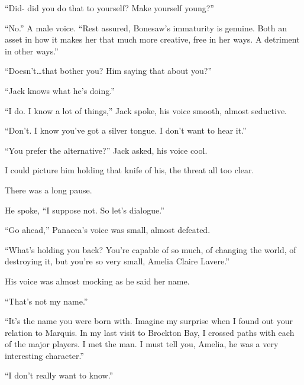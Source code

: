 ``Did- did you do that to yourself?  Make yourself young?''



``No.''  A male voice.  ``Rest assured, Bonesaw's immaturity is genuine.  Both an asset in how it makes her that much more creative, free in her ways.  A detriment in other ways.''



``Doesn't\ldots that bother you?  Him saying that about you?''



``Jack knows what he's doing.''



``I do.  I know a lot of things,'' Jack spoke, his voice smooth, almost seductive.



``Don't.  I know you've got a silver tongue.  I don't want to hear it.''



``You prefer the alternative?''  Jack asked, his voice cool.



I could picture him holding that knife of his, the threat all too clear.



There was a long pause.



He spoke, ``I suppose not.  So let's dialogue.''



``Go ahead,'' Panacea's voice was small, almost defeated.



``What's holding you back?  You're capable of so much, of changing the world, of destroying it, but you're so very small, Amelia Claire Lavere.''



His voice was almost mocking as he said her name.



``That's not my name.''



``It's the name you were born with.  Imagine my surprise when I found out your relation to Marquis.  In my last visit to Brockton Bay, I crossed paths with each of the major players.  I met the man.  I must tell you, Amelia, he was a very interesting character.''



``I don't really want to know.''




